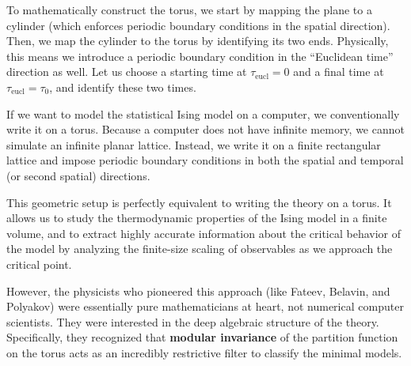 To mathematically construct the torus, we start by mapping the plane to a cylinder (which enforces periodic boundary conditions in the spatial direction). Then, we map the cylinder to the torus by identifying its two ends. Physically, this means we introduce a periodic boundary condition in the ``Euclidean time'' direction as well. Let us choose a starting time at \(\tau_{\text{eucl}} = 0\) and a final time at \(\tau_{\text{eucl}} = \tau_0\), and identify these two times.

\begin{example}
    If we want to model the statistical Ising model on a computer, we conventionally write it on a torus. Because a computer does not have infinite memory, we cannot simulate an infinite planar lattice. Instead, we write it on a finite rectangular lattice and impose periodic boundary conditions in both the spatial and temporal (or second spatial) directions.

    This geometric setup is perfectly equivalent to writing the theory on a torus. It allows us to study the thermodynamic properties of the Ising model in a finite volume, and to extract highly accurate information about the critical behavior of the model by analyzing the finite-size scaling of observables as we approach the critical point.
\end{example}

However, the physicists who pioneered this approach (like Fateev, Belavin, and Polyakov) were essentially pure mathematicians at heart, not numerical computer scientists. They were interested in the deep algebraic structure of the theory. Specifically, they recognized that \textbf{modular invariance} of the partition function on the torus acts as an incredibly restrictive filter to classify the minimal models.

